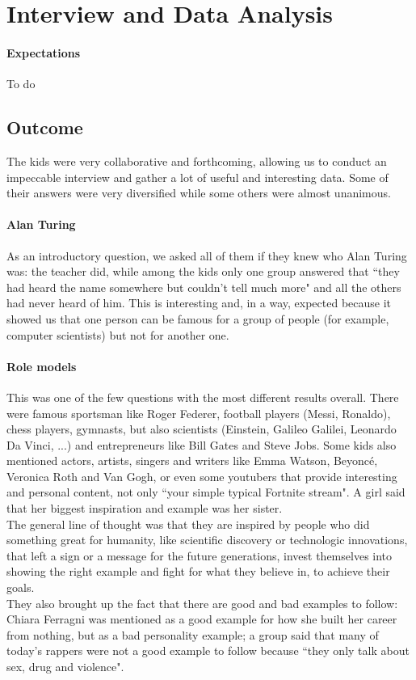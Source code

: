 \documentclass[12pt]{scrartcl}
\begin{document}
\section*{Interview and Data Analysis}
	\paragraph{Expectations}
		To do
		
	\subsection*{Outcome}
		The kids were very collaborative and forthcoming, allowing us to conduct an impeccable interview and gather a lot of useful and interesting data. Some of their answers were very diversified while some others were almost unanimous.
		
		\paragraph{Alan Turing} As an introductory question, we asked all of them if they knew who Alan Turing was: the teacher did, while among the kids only one group answered that ``they had heard the name somewhere but couldn't tell much more" and all the others had never heard of him. This is interesting and, in a way, expected because it showed us that one person can be famous for a group of people (for example, computer scientists) but not for another one.
		
		\paragraph{Role models} This was one of the few questions with the most different results overall. There were famous sportsman like Roger Federer, football players (Messi, Ronaldo), chess players, gymnasts, but also scientists (Einstein, Galileo Galilei, Leonardo Da Vinci, ...) and entrepreneurs like Bill Gates and Steve Jobs. Some kids also mentioned actors, artists, singers and writers like Emma Watson, Beyoncé, Veronica Roth and Van Gogh, or even some youtubers that provide interesting and personal content, not only ``your simple typical Fortnite stream". A girl said that her biggest inspiration and example was her sister.\\
		The general line of thought was that they are inspired by people who did something great for humanity, like scientific discovery or technologic innovations, that left a sign or a message for the future generations, invest themselves into showing the right example and fight for what they believe in, to achieve their goals.\\
		They also brought up the fact that there are good and bad examples to follow: Chiara Ferragni was mentioned as a good example for how she built her career from nothing, but as a bad personality example; a group said that many of today's rappers were not a good example to follow because ``they only talk about sex, drug and violence".
		
\end{document}
